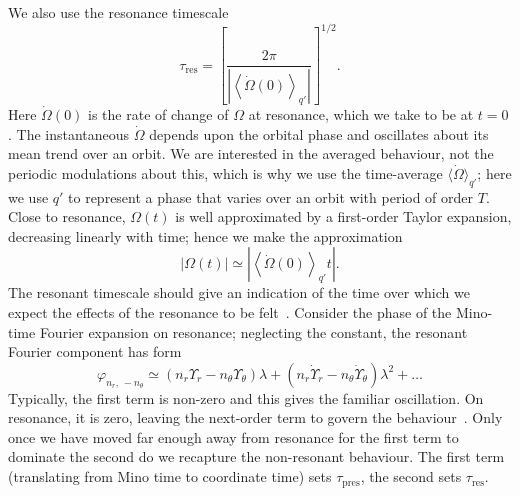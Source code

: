 \documentclass[aps,prd,amsfonts,amssymb,amsmath,nofootinbib,showpacs,superscriptaddress,twocolumn,floatfix]{revtex4-1}
\newcommand{\sub}[1]{\ensuremath{_\mathrm{#1}}}
\begin{document}
We also use the resonance timescale
\begin{equation}
\tau\sub{res} = \left[\frac{2\pi}{\left|\left\langle\dot{\Omega}(0)\right\rangle_{q'}\right|}\right]^{1/2}.
\label{eq:t-res}
\end{equation}
Here $\dot{\Omega}(0)$ is the rate of change of $\Omega$ at resonance, which we take to be at $t = 0$. The instantaneous $\dot{\Omega}$ depends upon the orbital phase and oscillates about its mean trend over an orbit. We are interested in the averaged behaviour, not the periodic modulations about this, which is why we use the time-average $\langle\dot{\Omega}\rangle_{q'}$; here we use $q'$ to represent a phase that varies over an orbit with period of order $T$. Close to resonance, $\Omega(t)$ is well approximated by a first-order Taylor expansion, decreasing linearly with time; hence we make the approximation
\begin{equation}
\left|{\Omega(t)}\right| \simeq \left|\left\langle\dot{\Omega}(0)\right\rangle_{q'} t\right|.
\label{eq:Taylor-Omega}
\end{equation}
The resonant timescale should give an indication of the time over which we expect the effects of the resonance to be felt~\cite{Bosley1992}. Consider the phase of the Mino-time Fourier expansion on resonance; neglecting the constant, the resonant Fourier component has form
\begin{equation}
\varphi_{n_r,\,-n_\theta} \simeq \left(n_r\Upsilon_r - n_\theta\Upsilon_\theta\right)\lambda + \left(n_r\dot{\Upsilon}_r - n_\theta\dot{\Upsilon}_\theta\right)\lambda^2 + \ldots
\end{equation}
Typically, the first term is non-zero and this gives the familiar oscillation. On resonance, it is zero, leaving the next-order term to govern the behaviour~\cite{Flanagan2012}. Only once we have moved far enough away from resonance for the first term to dominate the second do we recapture the non-resonant behaviour. The first term (translating from Mino time to coordinate time) sets $\tau\sub{pres}$, the second sets $\tau\sub{res}$.
\end{document}
